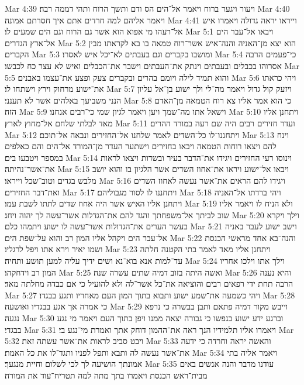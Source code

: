 Mar 4:39  ויעור ויגער ברוח ויאמר אל־הים הס ודם ותשך הרוח ותהי דממה רבה׃
Mar 4:40  ויאמר אליהם למה חרדים אתם איך חסרתם אמונה׃
Mar 4:41  וייראו יראה גדולה ויאמרו איש אל־רעהו מי אפוא הוא אשר גם הרוח וגם הים שמעים לו׃
Mar 5:1  ויבאו אל־עבר הים אל־ארץ הגדרים׃
Mar 5:2  הוא יצא מן־האניה והנה־איש אשר־רוח טמאה בו בא לקראתו מבין הקברים׃
Mar 5:3  ומושבו בקברים וגם בעבתים לא־יכל איש לאסרו׃
Mar 5:4  כי־פעמים הרבה אסרוהו בכבלים ובעבתים וינתק את־העבתים וישבר את־הכבלים ואיש לא עצר כח לכבשו׃
Mar 5:5  והוא תמיד לילה ויומם בהרים ובקברים צעק ופצע את־עצמו באבנים׃
Mar 5:6  ויהי כראתו את־ישוע מרחוק וירץ וישתחו לו׃
Mar 5:7  ויזעק קול גדול ויאמר מה־לי ולך ישוע בן־אל עליון הנני משביעך באלהים אשר לא תענני׃
Mar 5:8  כי הוא אמר אליו צא רוח הטמאה מן־האדם הזה׃
Mar 5:9  וישאל אתו מה־שמך ויען ויאמר לגיון שמי כי־רבים אנחנו׃
Mar 5:10  ויתחנן אליו מאד לבלתי שלחם אל־מחוץ לארץ׃
Mar 5:11  ועדר חזירים רבים היה שם רעה במורד ההרים׃
Mar 5:12  ויתחננו־לו כל־השדים לאמר שלחנו אל־החזירים ונבאה אל־תוכם׃
Mar 5:13  וינח להם ויצאו רוחות הטמאה ויבאו בחזירים וישתער העדר מן־המורד אל־הים והם כאלפים במספר ויטבעו בים׃
Mar 5:14  וינוסו רעי החזירים ויגידו את־הדבר בעיר ובשדות ויצאו לראות את־אשר־נהיתה׃
Mar 5:15  ויבאו אל־ישוע ויראו את־אחוז השדים אשר הלגיון בו והוא יושב מלבש בגדים וטוב־שכל וייראו׃
Mar 5:16  ויגידו להם הראים את־אשר נעשה לאחוז השדים ואת־דבר החזירים׃
Mar 5:17  ויתחננו לו לסור מגבוליהם׃
Mar 5:18  ויהי ברדתו אל־האניה ויתחנן אליו האיש אשר היה אחוז שדים לתתו לשבת עמו׃
Mar 5:19  ולא הניח לו ויאמר אליו שוב לביתך אל־משפחתך והגד להם את־הגדלות אשר־עשה לך יהוה ויחנ׃
Mar 5:20  וילך ויקרא בעשר הערים את־הגדולות אשר־עשה לו ישוע ויתמהו כלם׃
Mar 5:21  וישב ישוע לעבר באניה אל־עבר הים ויקהל אליו המון רב והוא על־שפת הים׃
Mar 5:22  והנה־בא אחד מראשי הכנסת ושמו יאיר וירא אתו ויפל לרגליו׃
Mar 5:23  ויתחנן אליו מאד לאמר בתי הקטנה חלתה עד־למות אנא בוא־נא ושים ידיך עליה למען תושע ותחיה׃
Mar 5:24  וילך אתו וילכו אחריו המון רב וידחקהו׃
Mar 5:25  ואשה היתה בזוב דמיה שתים עשרה שנה׃
Mar 5:26  והיא נענה הרבה תחת ידי רפאים רבים והוציאה את־כל אשר־לה ולא להועיל כי אם כבדה מחלתה מאד׃
Mar 5:27  ויהי כשמעה את־שמע ישוע ותבוא בתוך המון העם מאחריו ותגע בבגדו׃
Mar 5:28  כי אמרה אך אגע בבגדיו ואושעה׃
Mar 5:29  וייבש מקור דמיה פתאם ותבן בבשרה כי נרפא נגעה׃
Mar 5:30  וברגע ידע ישוע בנפשו כי גבורה יצאה ממנו ויפן בתוך העם ויאמר מי נגע בבגדי׃
Mar 5:31  ויאמרו אליו תלמידיו הנך ראה את־ההמון דוחק אתך ואמרת מי־נגע בי׃
Mar 5:32  ויבט סביב לראות את־אשר עשתה זאת׃
Mar 5:33  והאשה יראה וחרדה כי ידעה את־אשר נעשה לה ותבא ותפל לפניו ותגד־לו את כל האמת׃
Mar 5:34  ויאמר אליה בתי אמונתך הושיעה לך לכי לשלום וחיית מנגעך׃
Mar 5:35  עודנו מדבר והנה אנשים באים מבית־ראש הכנסת ויאמרו בתך מתה למה תטריח־עוד את המורה׃
